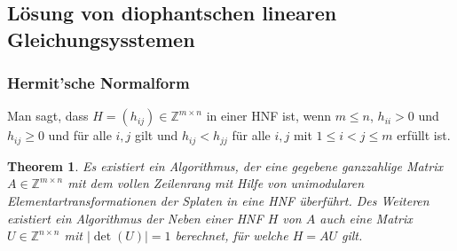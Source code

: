 \documentclass[
a4paper,12pt,
bibliography=totocnumbered,
numbers=noenddot,
]{scrartcl}
\numberwithin{equation}{subsection}
\newcommand{\Z}{\mathbb Z}
\theoremstyle{plain}
\newtheorem*{thm}{Theorem}
\theoremstyle{definition}
\begin{document}
\subsection{Lösung von diophantschen linearen Gleichungsysstemen} 


\subsubsection{Hermit'sche Normalform}

Man sagt, dass $H = (h_{ij}) \in \Z^{m \times n}$ in einer HNF ist, wenn $m \le n$, $h_{ii} > 0$ und $h_{ij} \ge 0$ und für alle $i,j$ gilt und $h_{ij} < h_{jj}$ für alle $i,j$ mit $1 \le i < j \le m$ erfüllt ist. 

\begin{thm}
	Es existiert ein Algorithmus, der eine gegebene ganzzahlige Matrix $A \in \Z^{m \times n}$ mit dem vollen Zeilenrang mit Hilfe von unimodularen Elementartransformationen der Splaten in eine HNF überführt. Des Weiteren existiert ein Algorithmus der Neben einer HNF $H$ von $A$ auch eine Matrix $U \in \Z^{n \times n}$ mit $|\det(U)|=1$ berechnet, für welche $H = A U$ gilt. 
\end{thm} 
\end{document}
